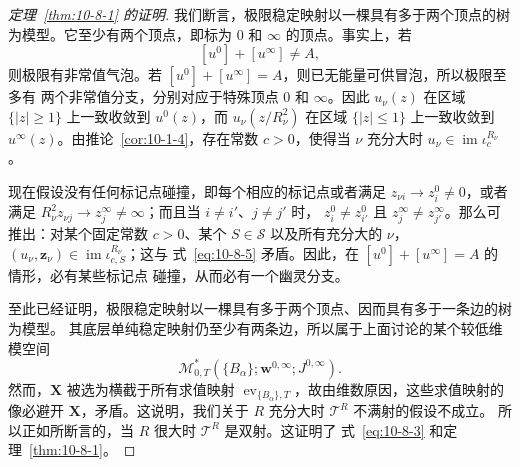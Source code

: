 \begin{proof}[定理~\ref{thm:10-8-1} 的证明]
我们断言，极限稳定映射以一棵具有多于两个顶点的树为模型。它至少有两个顶点，即标为
$0$ 和 $\infty$ 的顶点。事实上，若
\[
  [u^0]+[u^\infty]\ne A,
\]
则极限有非常值气泡。若 $[u^0]+[u^\infty]=A$，则已无能量可供冒泡，所以极限至多有
两个非常值分支，分别对应于特殊顶点 $0$ 和 $\infty$。因此 $u_\nu(z)$ 在区域
$\{|z|\geq1\}$ 上一致收敛到 $u^0(z)$，而 $u_\nu(z/R_\nu^2)$ 在区域
$\{|z|\leq1\}$ 上一致收敛到 $u^\infty(z)$。由推论~\ref{cor:10-1-4}，存在常数
$c>0$，使得当 $\nu$ 充分大时 $u_\nu\in\operatorname{im}\iota_c^{R_\nu}$。

现在假设没有任何标记点碰撞，即每个相应的标记点或者满足
$z_{\nu i}\to z_i^0\ne0$，或者满足
$R_\nu^2z_{\nu j}\to z_j^\infty\ne\infty$；而且当 $i\ne i'$、$j\ne j'$ 时，
$z_i^0\ne z_{i'}^0$ 且 $z_j^\infty\ne z_{j'}^\infty$。那么可推出：对某个固定常数
$c>0$、某个 $S\in\mathcal S$ 以及所有充分大的 $\nu$，
$(u_\nu,\mathbf z_\nu)\in\operatorname{im}\iota_{c,S}^{R_\nu}$；这与
式~\eqref{eq:10-8-5} 矛盾。因此，在 $[u^0]+[u^\infty]=A$ 的情形，必有某些标记点
碰撞，从而必有一个幽灵分支。

至此已经证明，极限稳定映射以一棵具有多于两个顶点、因而具有多于一条边的树为模型。
其底层单纯稳定映射仍至少有两条边，所以属于上面讨论的某个较低维模空间
\[
  \mathcal M_{0,T}^*(\{B_\alpha\};\mathbf w^{0,\infty};J^{0,\infty}).
\]
然而，$\mathbf X$ 被选为横截于所有求值映射
$\operatorname{ev}_{\{B_\alpha\},T}$，故由维数原因，这些求值映射的像必避开
$\mathbf X$，矛盾。这说明，我们关于 $R$ 充分大时 $\mathcal T^R$ 不满射的假设不成立。
所以正如所断言的，当 $R$ 很大时 $\mathcal T^R$ 是双射。这证明了
式~\eqref{eq:10-8-3} 和定理~\ref{thm:10-8-1}。
\end{proof}
